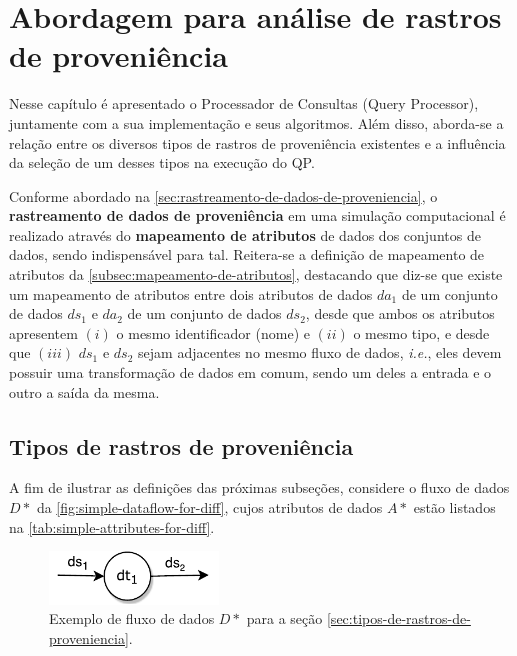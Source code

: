 
\chapter{Abordagem para análise de rastros de proveniência}%
\label{chap:rastros-de-proveniencia}

Nesse capítulo é apresentado o Processador de Consultas (Query Processor), juntamente com a sua implementação e seus algoritmos. Além disso, aborda-se a relação entre os diversos tipos de rastros de proveniência existentes e a influência da seleção de um desses tipos na execução do QP.

Conforme abordado na \autoref{sec:rastreamento-de-dados-de-proveniencia}, o \textbf{rastreamento de dados de proveniência} em uma simulação computacional é realizado através do \textbf{mapeamento de atributos} de dados dos conjuntos de dados, sendo indispensável para tal. Reitera-se a definição de mapeamento de atributos da \autoref{subsec:mapeamento-de-atributos}, destacando que diz-se que existe um mapeamento de atributos entre dois atributos de dados \(da_1\) de um conjunto de dados \(ds_1\) e \(da_2\) de um conjunto de dados \(ds_2\), desde que ambos os atributos apresentem \((i)\) o mesmo identificador (nome) e \((ii)\) o mesmo tipo, e desde que \((iii)\) \(ds_1\) e \(ds_2\) sejam adjacentes no mesmo fluxo de dados, \textit{i.e.}, eles devem possuir uma transformação de dados em comum, sendo um deles a entrada e o outro a saída da mesma.

\section{Tipos de rastros de proveniência}%
\label{sec:tipos-de-rastros-de-proveniencia}

A fim de ilustrar as definições das próximas subseções, considere o fluxo de dados  \(D\ast\) da \autoref{fig:simple-dataflow-for-diff}, cujos atributos de dados \(A\ast\) estão listados na \autoref{tab:simple-attributes-for-diff}. 

\begin{figure}[htb]
    \centering
    \includegraphics[width=0.4\textwidth]{img/simple-dataflow-for-diff}
    \caption[Exemplo de fluxo de dados para a seção \autoref{sec:tipos-de-rastros-de-proveniencia}]{Exemplo de fluxo de dados \(D\ast\) para a seção \autoref{sec:tipos-de-rastros-de-proveniencia}.}%
    \label{fig:simple-dataflow-for-diff}
\end{figure}

